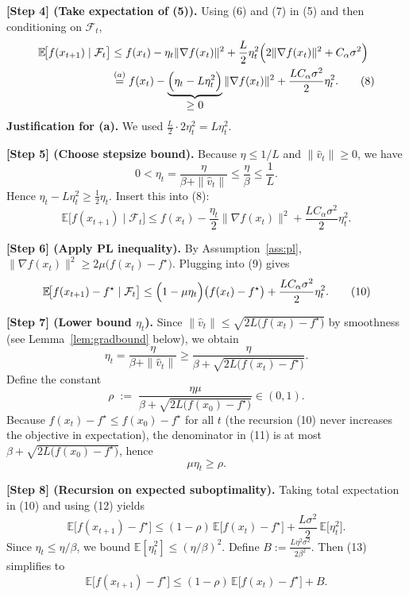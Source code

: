 \documentclass{article}
\newcommand{\E}{\mathbb{E}}
\begin{document}
\noindent\textbf{[Step 4] (Take expectation of (5)).}
Using (6) and (7) in (5) and then conditioning on $\mathcal F_{t}$,
\begin{align}
\E\!\bigl[f(x_{t+1})\mid\mathcal F_{t}\bigr]
 &\le f(x_{t})
   -\eta_{t}\|\nabla f(x_{t})\|^{2}
   +\frac{L}{2}\eta_{t}^{2}\Bigl(2\|\nabla f(x_{t})\|^{2}+C_{\alpha}\sigma^{2}\Bigr) \nonumber\\
 &\stackrel{(a)}{=}
   f(x_{t})-\underbrace{\Bigl(\eta_{t}-L\eta_{t}^{2}\Bigr)}_{\displaystyle\ge0}
   \|\nabla f(x_{t})\|^{2}
   +\frac{L C_{\alpha}\sigma^{2}}{2}\eta_{t}^{2}. \tag{8}
\end{align}
\noindent\textbf{Justification for (a).}
We used $ \frac{L}{2}\cdot 2\eta_{t}^{2}=L\eta_{t}^{2}$.

\noindent\textbf{[Step 5] (Choose stepsize bound).}
Because $\eta\le 1/L$ and $\|\hat v_{t}\|\ge0$, we have
\[
0<\eta_{t}= \frac{\eta}{\beta+\|\hat v_{t}\|}\le\frac{\eta}{\beta}\le\frac{1}{L}.
\]
Hence $ \eta_{t}-L\eta_{t}^{2}\ge \frac{1}{2}\eta_{t}$.
Insert this into (8):
\begin{equation}
\E\!\bigl[f(x_{t+1})\mid\mathcal F_{t}\bigr]
   \le f(x_{t})-\frac{\eta_{t}}{2}\|\nabla f(x_{t})\|^{2}
      +\frac{L C_{\alpha}\sigma^{2}}{2}\eta_{t}^{2}. \tag{9}
\end{equation}

\noindent\textbf{[Step 6] (Apply PL inequality).}
By Assumption~\ref{ass:pl},
$\|\nabla f(x_{t})\|^{2}\ge 2\mu\bigl(f(x_{t})-f^{\star}\bigr)$. 
Plugging into (9) gives
\begin{equation}
\E\!\bigl[f(x_{t+1})-f^{\star}\mid\mathcal F_{t}\bigr]
   \le\Bigl(1-\mu\eta_{t}\Bigr)\bigl(f(x_{t})-f^{\star}\bigr)
      +\frac{L C_{\alpha}\sigma^{2}}{2}\eta_{t}^{2}. \tag{10}
\end{equation}

\noindent\textbf{[Step 7] (Lower bound $\eta_{t}$).}
Since $\|\hat v_{t}\|\le \sqrt{2L\bigl(f(x_{t})-f^{\star}\bigr)}$
by smoothness (see Lemma~\ref{lem:gradbound} below), we obtain
\[
\eta_{t}
   =\frac{\eta}{\beta+\|\hat v_{t}\|}
   \ge\frac{\eta}{\beta+\sqrt{2L\bigl(f(x_{t})-f^{\star}\bigr)}}.
\tag{11}
\]
Define the constant
\[
\rho\;:=\;\frac{\eta\mu}{\beta+\sqrt{2L\bigl(f(x_{0})-f^{\star}\bigr)}}\in(0,1).
\]
Because $f(x_{t})-f^{\star}\le f(x_{0})-f^{\star}$ for all $t$
(the recursion (10) never increases the objective in expectation),
the denominator in (11) is at most $\beta+\sqrt{2L\bigl(f(x_{0})-f^{\star}\bigr)}$,
hence
\[
\mu\eta_{t}\ge\rho. \tag{12}
\]

\noindent\textbf{[Step 8] (Recursion on expected suboptimality).}
Taking total expectation in (10) and using (12) yields
\begin{equation}
\E\bigl[f(x_{t+1})-f^{\star}\bigr]
   \le (1-\rho)\,\E\bigl[f(x_{t})-f^{\star}\bigr]
        +\frac{L\sigma^{2}}{2}\,\E\!\bigl[\eta_{t}^{2}\bigr]. \tag{13}
\end{equation}
Since $\eta_{t}\le \eta/\beta$, we bound $\E[\eta_{t}^{2}]\le (\eta/\beta)^{2}$.
Define $B:=\frac{L\eta^{2}\sigma^{2}}{2\beta^{2}}$.
Then (13) simplifies to
\[
\E\bigl[f(x_{t+1})-f^{\star}\bigr]
   \le (1-\rho)\,\E\bigl[f(x_{t})-f^{\star}\bigr]+B. \tag{14}
\]
\end{document}
